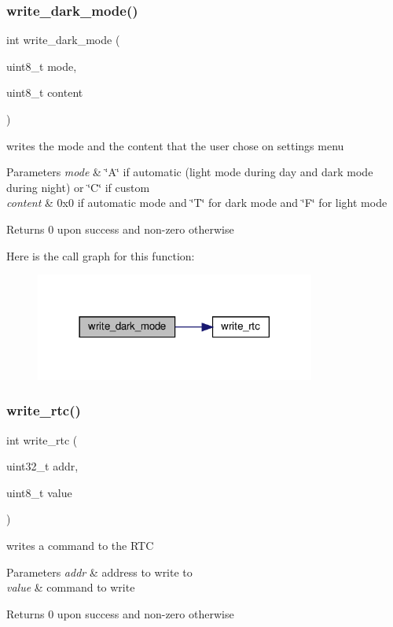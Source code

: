 \subsubsection{\texorpdfstring{write\+\_\+dark\+\_\+mode()}{write\_dark\_mode()}}
{\footnotesize\ttfamily int write\+\_\+dark\+\_\+mode (\begin{DoxyParamCaption}\item[{uint8\+\_\+t}]{mode,  }\item[{uint8\+\_\+t}]{content }\end{DoxyParamCaption})}



writes the mode and the content that the user chose on settings menu 


\begin{DoxyParams}{Parameters}
{\em mode} & \char`\"{}\+A\char`\"{} if automatic (light mode during day and dark mode during night) or \char`\"{}\+C\char`\"{} if custom \\
\hline
{\em content} & 0x0 if automatic mode and \char`\"{}\+T\char`\"{} for dark mode and \char`\"{}\+F\char`\"{} for light mode \\
\hline
\end{DoxyParams}
\begin{DoxyReturn}{Returns}
0 upon success and non-\/zero otherwise 
\end{DoxyReturn}
Here is the call graph for this function\+:\nopagebreak
\begin{figure}[H]
\begin{center}
\leavevmode
\includegraphics[width=261pt]{group__RealTimeClock_gab680718c3cc588942fae4b697a99a7a3_cgraph}
\end{center}
\end{figure}
\mbox{\label{group__RealTimeClock_ga22b6726ecbb76b91e8cbe61bfbc06595}} 
\subsubsection{\texorpdfstring{write\+\_\+rtc()}{write\_rtc()}}
{\footnotesize\ttfamily int write\+\_\+rtc (\begin{DoxyParamCaption}\item[{uint32\+\_\+t}]{addr,  }\item[{uint8\+\_\+t}]{value }\end{DoxyParamCaption})}



writes a command to the R\+TC 


\begin{DoxyParams}{Parameters}
{\em addr} & address to write to \\
\hline
{\em value} & command to write \\
\hline
\end{DoxyParams}
\begin{DoxyReturn}{Returns}
0 upon success and non-\/zero otherwise 
\end{DoxyReturn}
